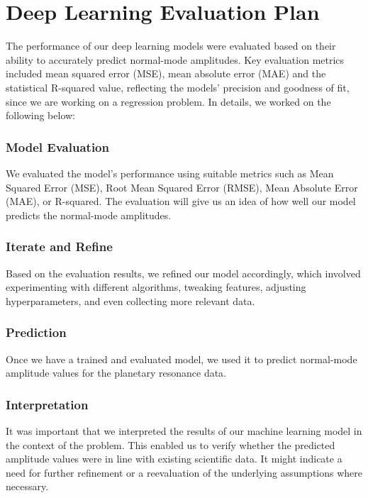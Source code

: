 \documentclass[conference]{IEEEtran}
\begin{document}
\section{Deep Learning Evaluation Plan}
The performance of our deep learning models were evaluated based on their ability to accurately predict normal-mode amplitudes. Key evaluation metrics included mean squared error (MSE), mean absolute error (MAE) and the statistical R-squared value, reflecting the models' precision and goodness of fit, since we are working on a regression problem. In details, we worked on the following below:
\subsubsection{Model Evaluation} 
We evaluated the model's performance using suitable metrics such as Mean Squared Error (MSE), Root Mean Squared Error (RMSE), Mean Absolute Error (MAE), or R-squared. The evaluation will give us an idea of how well our model predicts the normal-mode amplitudes.
\subsubsection{Iterate and Refine} 
Based on the evaluation results, we refined our model accordingly, which involved experimenting with different algorithms, tweaking features, adjusting hyperparameters, and even collecting more relevant data.
\subsubsection{Prediction} 
Once we have a trained and evaluated model, we used it to predict normal-mode amplitude values for the planetary resonance data.
\subsubsection{Interpretation} 
It was important that we interpreted the results of our machine learning model in the context of the problem. This enabled us to verify whether the predicted amplitude values were in line with existing scientific data. It might indicate a need for further refinement or a reevaluation of the underlying assumptions where necessary.
\end{document}
